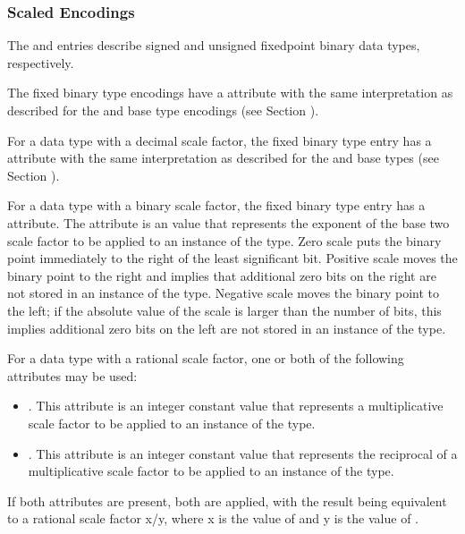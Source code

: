 \subsubsection{Scaled Encodings}
\label{chap:scaledencodings}
The \DWATEsignedfixed{} and \DWATEunsignedfixed{} entries
describe signed and unsigned fixed\dash point binary data types,
respectively.

The fixed binary type encodings have a
\DWATdigitcount{} attribute
with the same interpretation as described for the
\DWATEpackeddecimal{} and \DWATEnumericstring{} base type encodings
(see Section ).

For a data type with a decimal scale factor,
the fixed binary
type entry has a \DWATdecimalscale{} attribute
with the same interpretation as described for the
\DWATEpackeddecimal{} and \DWATEnumericstring{} base types
(see Section ).

For\hypertarget{chap:DWATbinaryscalebinaryscalefactorforfixedpointtype}{}
a data type with a binary scale factor, the fixed
binary type entry has a \DWATbinaryscaleNAME{} attribute.
The \DWATbinaryscaleDEFN{} attribute
is an  value
that represents the exponent of the base two scale factor to
be applied to an instance of the type.  Zero scale puts the
binary point immediately to the right of the least significant
bit. Positive scale moves the binary point to the right and
implies that additional zero bits on the right are not stored
in an instance of the type. Negative scale moves the binary
point to the left; if the absolute value of the scale is
larger than the number of bits, this implies additional zero
bits on the left are not stored in an instance of the type.

\bb
For a data type with a rational scale factor,
one or both of the following attributes may be used:
\begin{itemize}
\item
\DWATscalemultiplierDEFN\hypertarget{chap:DWATscalemultiplierofscalefactor}{}.
This attribute is an integer constant value
that represents a multiplicative scale factor to be applied to an
instance of the type.
\item
\DWATscaledivisorDEFN\hypertarget{chap:DWATscaledivisorofscalefactor}{}.
This attribute is an integer constant value
that represents the reciprocal of a multiplicative scale factor to be
applied to an instance of the type.
\end{itemize}
If both attributes are present, both are applied, with the result
being equivalent to a rational scale factor x/y, where x is the
value of \DWATscalemultiplierNAME{} and y is the value of \DWATscaledivisorNAME.
\eb


